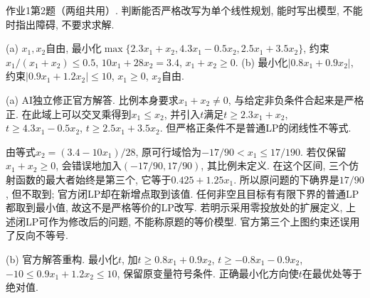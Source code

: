 \begin{exercise}\label{ass:15053-ps1-q2}
作业1第2题（两组共用）. 判断能否严格改写为单个线性规划, 能时写出模型, 不能时指出障碍, 不要求求解.

(a) $x_1,x_2$自由, 最小化$\max\{2.3x_1+x_2,4.3x_1-0.5x_2,2.5x_1+3.5x_2\}$, 约束$x_1/(x_1+x_2)\le0.5$, $10x_1+28x_2=3.4$, $x_1+x_2\ge0$. (b) 最小化$|0.8x_1+0.9x_2|$, 约束$|0.9x_1+1.2x_2|\le10$, $x_1\ge0$, $x_2$自由.
\end{exercise}
\begin{solution}
(a) AI独立修正官方解答. 比例本身要求$x_1+x_2\ne0$, 与给定非负条件合起来是严格正. 在此域上可以交叉乘得到$x_1\le x_2$, 并引入$t$满足$t\ge2.3x_1+x_2$, $t\ge4.3x_1-0.5x_2$, $t\ge2.5x_1+3.5x_2$. 但严格正条件不是普通LP的闭线性不等式.

由等式$x_2=(3.4-10x_1)/28$, 原可行域恰为$-17/90<x_1\le17/190$. 若仅保留$x_1+x_2\ge0$, 会错误地加入$(-17/90,17/90)$, 其比例未定义. 在这个区间, 三个仿射函数的最大者始终是第三个, 它等于$0.425+1.25x_1$. 所以原问题的下确界是$17/90$, 但不取到; 官方闭LP却在新增点取到该值. 任何非空且目标有有限下界的普通LP都取到最小值, 故这不是严格等价的LP改写. 若明示采用零投放处的扩展定义, 上述闭LP可作为修改后的问题, 不能称原题的等价模型. 官方第三个上图约束还误用了反向不等号.

(b) 官方解答重构. 最小化$t$, 加$t\ge0.8x_1+0.9x_2$, $t\ge-0.8x_1-0.9x_2$, $-10\le0.9x_1+1.2x_2\le10$, 保留原变量符号条件. 正确最小化方向使$t$在最优处等于绝对值.
\end{solution}

